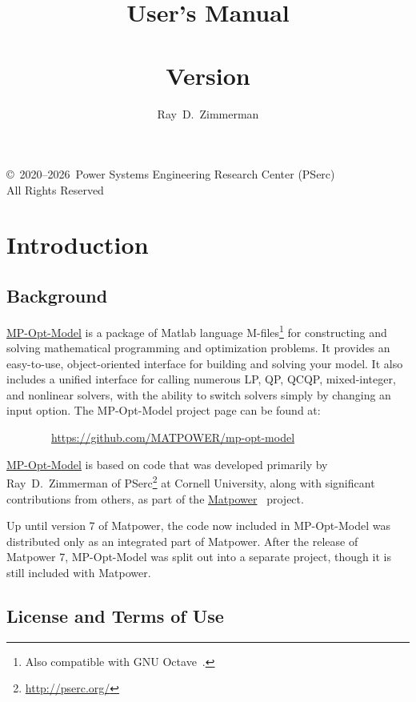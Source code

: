 \documentclass[12pt]{article}
\title{{\huge \bfseries \mpomname{} User's Manual } \\ ~ \\ \LARGE Version \mpomver{}}
\author{Ray~D.~Zimmerman}
\newcommand{\matlab}[0]{{\sc Matlab}}
\newcommand{\matpower}[0]{{\sc Matpower}}
\newcommand{\matpowerurl}[0]{https://matpower.org}
\newcommand{\matpowerlink}[0]{\href{\matpowerurl}{\matpower{}}}
\newcommand{\mpom}[0]{\mbox{MP-Opt-Model}}
\newcommand{\mpomurl}[0]{https://github.com/MATPOWER/mp-opt-model}
\newcommand{\mpomlink}[0]{\href{\mpomurl}{\mpom{}}}
\newcommand{\pserc}[0]{{\sc PSerc}}
\newcommand{\PSERC}[0]{{Power Systems Engineering Research Center (\pserc{})}}
\numberwithin{equation}{section}
\numberwithin{table}{section}
\numberwithin{figure}{section}
\begin{document}
\maketitle
\thispagestyle{empty}
\vfill
\begin{center}
{\scriptsize
\copyright~2020--2026~\PSERC{}\\
All Rights Reserved}
\end{center}

\clearpage
\tableofcontents
\clearpage
\listoftables

\clearpage
\section{Introduction}

\subsection{Background}

\mpomlink{} is a package of \matlab{} language M-files\footnote{Also compatible with GNU Octave~\cite{octave}.} for constructing and solving mathematical programming and optimization problems. It provides an easy-to-use, object-oriented interface for building and solving your model. It also includes a unified interface for calling numerous LP, QP, QCQP, mixed-integer, and nonlinear solvers, with the ability to switch solvers simply by changing an input option.
The \mpom{} project page can be found at:

\bigskip

~~~~~~~~\url{\mpomurl}

\bigskip

\mpomlink{} is based on code that was developed primarily by Ray~D.~Zimmerman of \pserc{}\footnote{\url{http://pserc.org/}} at Cornell University, along with significant contributions from others, as part of the \matpowerlink{}~\cite{zimmerman2011,matpower} project.

Up until version 7 of \matpower{}, the code now included in \mpom{} was distributed only as an integrated part of \matpower{}. After the release of \matpower{} 7, \mpom{} was split out into a separate project, though it is still included with \matpower{}.

\clearpage
\subsection{License and Terms of Use}
\end{document}
